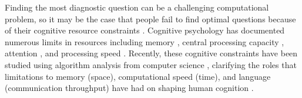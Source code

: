 \documentclass[10pt,letterpaper]{article}
\begin{document}
Finding the most diagnostic question can be a challenging computational problem, so it may be the case that people fail to find optimal questions because of their cognitive resource constraints \cite{coenen2019asking}. 
Cognitive psychology has documented numerous limits in resources including memory \cite{baddeley1997human}, central processing capacity \cite{pashler1984processing}, attention \cite{cavanagh2005tracking}, and processing speed \cite{ratcliff1998modeling}. 
Recently, these cognitive constraints have been studied using algorithm analysis from computer science \cite{LiederResourcerationalanalysisUnderstanding2020, gershman2015computational,dasgupta2021memory}, clarifying the roles that limitations to memory (space), computational speed (time), and language (communication throughput) have had on shaping human cognition \cite{GriffithsRationalUseCognitive2015a, griffiths2020understanding}.
\end{document}
